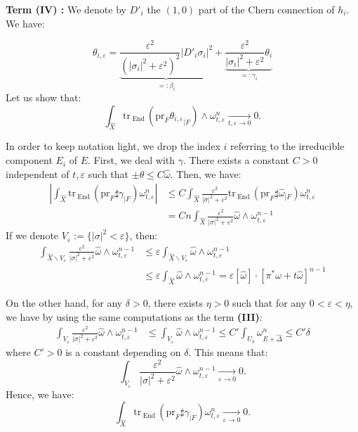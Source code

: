 \documentclass[12pt,a4paper]{amsart}
\newcommand{\End}{\mathrm{End}\,}
\newcommand{\tr}{\mathrm{tr}\,}
\theoremstyle{plain}
\theoremstyle{definition}
\begin{document}
\textbf{Term (IV) :}
We denote by $D'_i$ the $(1,0)$ part of the Chern connection of $h_i$. We have:

$$
\theta_{i,\varepsilon} = \underbrace{\frac{\varepsilon^2}{(|\sigma_i|^2 + \varepsilon^2)^2}|D'_i\sigma_i|^2}_{=:\beta_i} + \underbrace{\frac{\varepsilon^2}{|\sigma_i|^2 + \varepsilon^2} \theta_i}_{=: \gamma_i}
$$
Let us show that:
$$
\int_{\widehat{X}} \tr_\End(\mathrm{pr}_F{\theta_{i, \varepsilon}}_{|F}) \wedge \omega_{t, \varepsilon}^{n} \underset{t, \varepsilon \longrightarrow 0}{\longrightarrow} 0.
$$

In order to keep notation light, we drop the index $i$ referring to the irreducible component $E_i$ of $E$. First, we deal with $\gamma$. There exists a constant $C > 0$ independent of $t, \varepsilon$ such that $\pm \theta \leq C \widehat{\omega}$. Then, we have:
\begin{align*}
    \left| \int_{\widehat{X}} \tr_\End(\mathrm{pr}_F \sharp \gamma_{|F}) \omega_{t, \varepsilon}^n \right| & \leq C \int_{\widehat{X}} \frac{\varepsilon^2}{|\sigma|^2 + \varepsilon^2} \tr_\End(\mathrm{pr}_F \sharp \widehat{\omega}_{|F}) \omega_{t, \varepsilon}^n \\
    & = Cn \int_{\widehat{X}} \frac{\varepsilon^2}{|\sigma|^2 + \varepsilon^2} \widehat{\omega} \wedge \omega_{t, \varepsilon}^{n-1}
\end{align*}
If we denote $V_{\varepsilon} := \lbrace |\sigma|^2 < \varepsilon \rbrace$, then:
\begin{align*}
    \int_{\widehat{X} \backslash V_{\varepsilon}} \frac{\varepsilon^2}{|\sigma|^2 + \varepsilon^2} \widehat{\omega} \wedge \omega_{t, \varepsilon}^{n-1} 
    & \leq \varepsilon \int_{\widehat{X} \backslash V_{\varepsilon}} \widehat{\omega} \wedge \omega_{t, \varepsilon}^{n-1} \\
    & \leq \varepsilon \int_{\widehat{X}} \widehat{\omega} \wedge \omega_{t, \varepsilon}^{n-1} = \varepsilon \left[ \widehat{\omega} \right] \cdot \left[ \pi^* \omega + t\widehat{\omega} \right]^{n-1} 
\end{align*}

On the other hand, for any $\delta > 0$, there exists $\eta > 0$ such that for any $0 < \varepsilon < \eta$, we have by using the same computations as the term \textbf{(III)}:
\begin{align*}
    \int_{V_{ \varepsilon}} \frac{\varepsilon^2}{|\sigma|^2 + \varepsilon^2} \widehat{\omega} \wedge \omega_{t, \varepsilon}^{n-1} & \leq \int_{V_{ \varepsilon}} \widehat{\omega} \wedge \omega_{t, \varepsilon}^{n-1} \leq C' \int_{U_\delta} \omega_{E + \widehat{\Delta}}^n \leq C'\delta
\end{align*}
where $C' > 0$ is a constant depending on $\delta$.
This means that:
$$
\int_{V_{\varepsilon}} \frac{\varepsilon^2}{|\sigma|^2 + \varepsilon^2} \widehat{\omega} \wedge \omega_{t, \varepsilon}^{n-1} \underset{\varepsilon \longrightarrow 0}{\longrightarrow} 0.
$$
Hence, we have:
$$
\int_{\widehat{X}} \tr_\End(\mathrm{pr}_F \sharp \gamma_{|F}) \omega_{t, \varepsilon}^n \underset{\varepsilon \longrightarrow 0}{\longrightarrow} 0.
$$
\end{document}
